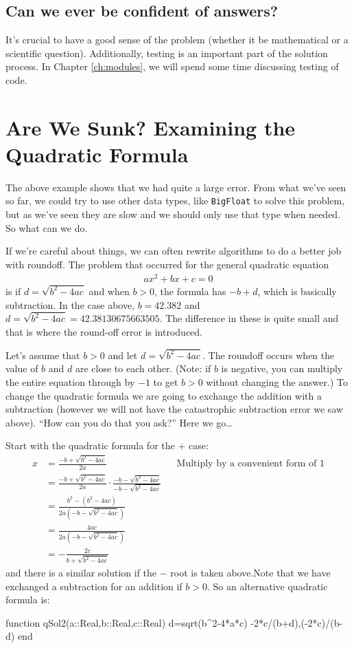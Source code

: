 \subsection{Can we ever be confident of answers?}

It's crucial to have a good sense of the problem (whether it be
mathematical or a scientific question). Additionally, testing is an
important part of the solution process. In Chapter \ref{ch:modules}, we will spend some time discussing testing of code. 


\section{Are We Sunk?  Examining the Quadratic Formula}

The above example shows that we had quite a large error.  From what we've seen so far, we could try to use other data types, like \verb!BigFloat! to solve this problem, but as we've seen they are slow and we should only use that type when needed.  So what can we do. 

If we're careful about things, we can often rewrite algorithms to do a better job with roundoff.  The problem that occurred for the general quadratic equation
\begin{align*}
ax^2+bx+c=0
\end{align*}
is if $d=\sqrt{b^{2}-4ac}$ and when $b>0$, the formula has $-b+d$, which is basically subtraction.  In the
case above, $b=42.382$ and $d=\sqrt{b^{2}-4ac}=42.38130675663505$. The
difference in these is quite small and that is where the round-off error
is introduced.

Let's assume that $b>0$ and let $d=\sqrt{b^{2}-4ac}$. The
roundoff occurs when the value of $b$ and $d$ are close to each
other. (Note: if $b$ is negative, you can multiply the entire equation
through by $-1$ to get $b>0$ without changing the answer.) 
To change the quadratic formula we are going to exchange the addition
with a subtraction (however we will not have the catastrophic
subtraction error we saw above). ``How can you do that you ask?'' Here
we go\ldots{}

Start with the quadratic formula for the $+$ case: 
\begin{align*}
x& =\frac{-b + \sqrt{b^{2}-4ac}} {2a} &&\text{Multiply by a convenient form of 1} \\
& =\frac{-b + \sqrt{b^{2}-4ac}} {2a} \cdot \frac{-b-\sqrt{b^{2}-4ac}}{-b-\sqrt{b^{2}-4ac}} \\
& = \frac{b^{2}-(b^{2}-4ac)}{2a(-b-\sqrt{b^{2}-4ac})} \\
& = \frac{4ac}{2a(-b-\sqrt{b^{2}-4ac})} \\
& = -\frac{2c}{b+\sqrt{b^{2}-4ac}}
\end{align*}
%
and there is a similar solution if the $-$ root is taken above.Note that we have exchanged a subtraction for an addition if $b>0$.  So an
alternative quadratic formula is:
%
\begin{jlblock}
function qSol2(a::Real,b::Real,c::Real)
  d=sqrt(b^2-4*a*c)
  -2*c/(b+d),(-2*c)/(b-d)
end
\end{jlblock}


